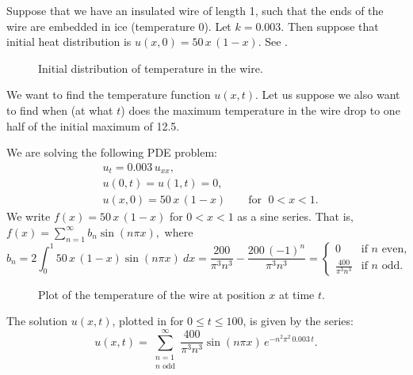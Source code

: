 \documentclass[12pt]{book}
\begin{document}
\begin{example}
Suppose that we have an insulated wire of length 1, such
that
the ends of the wire are embedded in ice (temperature 0).
Let $k=0.003$.  Then suppose that initial heat distribution
is $u(x,0) = 50\,x\,(1-x)$.
See .

\begin{figure}[h!t]
\capstart
\begin{center}
\caption{Initial distribution of temperature in the
wire.\label{heat:wireexinitfig}}
\end{center}
\end{figure}

We want to find the temperature function $u(x,t)$.  Let us suppose we also
want to find when (at what $t$) does the maximum temperature in the wire 
drop to one half of the initial maximum of 12.5.

We are solving the following PDE problem:
\begin{align*}
& u_t = 0.003 \, u_{xx} , \\
& u(0,t) = u(1,t) = 0 , \\
& u(x,0) = 50\,x\,(1-x) \qquad \text{for } \; 0 < x < 1 .
\end{align*}
We write $f(x) = 50\,x\,(1-x)$ for $0 < x < 1$ as a sine series.  That is,
$
f(x) = \sum_{n=1}^\infty b_n \sin (n \pi x) ,
$
where
\begin{equation*}
b_n = 2 \int_0^1 50\,x\,(1-x) \sin (n \pi x) ~dx
= 
\frac{200}{{\pi }^{3}{n}^{3}}-\frac{200\,{\left( -1\right) }^{n}}{{\pi }^{3}{n}^{3}}
=
\begin{cases}
0 & \text{if } n \text{ even} , \\
\frac{400}{\pi^3 n^3} & \text{if } n \text{ odd} .
\end{cases}
\end{equation*}

\begin{figure}[h!t]
\capstart
\begin{center}
\caption{Plot of the temperature of the wire at position $x$
at time $t$.\label{heat:wireexfig}}
\end{center}
\end{figure}


The solution $u(x,t)$, plotted in
 for $0 \leq t \leq 100$,
is given by the series:
\begin{equation*}
u(x,t) = 
\sum_{\substack{n=1 \\ n \text{ odd}}}^\infty
\frac{400}{\pi^3 n^3}
\sin (n \pi x )
\, e^{-n^2 \pi^2 \, 0.003 \, t} .
\end{equation*}



\end{example}
\end{document}

